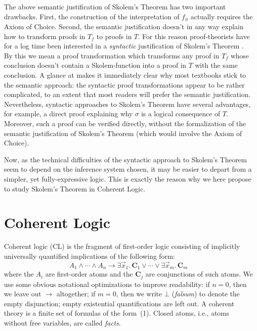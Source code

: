 \documentclass[12pt]{article}
\newcommand{\ra}{\rightarrow}
\newcommand{\Tf}{T_{\!f}}
\begin{document}
The above semantic justification of Skolem's Theorem has two important
drawbacks. First, the construction of the interpretation of
$f_\phi$ actually requires the Axiom of Choice. Second, the semantic justification
doesn't in any way explain how to transform proofs in $\Tf$ to proofs in $T$.
For this reason proof-theorists have for a log time been interested in a \emph{syntactic}
justification of Skolem's Theorem \cite{Maehara}. By this we mean a proof transformation
which transforms any proof in $\Tf$ whose conclusion doesn't contain
a Skolem-function into a proof in $T$ with the same conclusion. 
A glance at \cite[Ch.~7]{Gallier} makes it
immediately clear why most textbooks stick to the semantic approach:
the syntactic proof transformations appear to be rather complicated, 
to an extent that most readers will prefer the semantic justification.
Nevertheless, syntactic approaches to Skolem's Theorem
have several advantages, for example, a direct proof explaining why $\sigma$
is a logical consequence of $T$. Moreover, such a proof can be verified directly, 
without the formalization of the semantic justification of Skolem's Theorem
(which would involve the Axiom of Choice).

Now, as the technical difficulties of the syntactic approach to Skolem's Theorem
seem to depend on the inference system chosen, it may be easier to depart
from a simpler, yet fully-expressive logic.
This is exactly the reason why we here propose to study Skolem's Theorem
in Coherent Logic. 


\section{Coherent Logic}\label{sec:cl}

Coherent logic (CL) is
the fragment of first-order logic consisting of implicitly universally quantified
implications of the following form:
\begin{equation}%
  {A_1 \wedge \cdots \wedge A_n} 
  \ra 
  {\exists \vec{x}_1.\,\mathbf{C}_1 \vee \cdots \vee \exists \vec{x}_m.\,\mathbf{C}_m}
\end{equation}
where the $A_i$ are first-order atoms and the $\mathbf{C}_{j}$ are 
conjunctions of such atoms. We use some obvious
notational optimizations to improve readability:
if $n=0$, then we leave out $\ra$ altogether;
if $m=0$, then we write $\bot$ (\textit{falsum}) 
to denote the empty disjunction; 
empty existential quantifications are left out.
A coherent theory is a finite set of formulas of the form~(1). %
Closed atoms, i.e., atoms without free variables, are called \emph{facts}.
\end{document}

